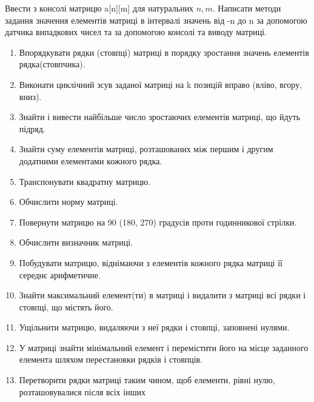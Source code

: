 \documentclass[]{article}
\begin{document}
Ввести з консолі матрицю a[n][m] для натуральних $n,m$. Написати методи задання значення елементів матриці в інтервалі значень від -n до n за допомогою датчика випадкових чисел та за допомогою консолі та виводу матриці.
\begin{enumerate}
\def\labelenumi{2.\arabic{enumi}.}

\item Впорядкувати рядки (стовпці) матриці в порядку зростання значень елементів рядка(стовпчика).
\item Виконати циклічний зсув заданої матриці на k позицій вправо (вліво, вгору, вниз).
\item Знайти і вивести найбільше число зростаючих елементів матриці, що йдуть підряд.
\item Знайти суму елементів матриці, розташованих між першим і другим додатними елементами кожного рядка.
\item Транспонувати квадратну матрицю.
\item Обчислити норму матриці.
\item Повернути матрицю на 90 (180, 270) градусів проти годинникової стрілки.
\item Обчислити визначник матриці.
\item Побудувати матрицю, віднімаючи з елементів кожного рядка матриці її середнє арифметичне.
\item Знайти максимальний елемент(ти) в матриці і видалити з матриці всі рядки і стовпці, що містять його.
\item Ущільнити матрицю, видаляючи з неї рядки і стовпці, заповнені нулями.
\item У матриці знайти мінімальний елемент і перемістити його на місце заданного елемента шляхом перестановки рядків і стовпців.
\item Перетворити рядки матриці таким чином, щоб елементи, рівні нулю, розташовувалися після всіх інших


\end{enumerate}
\end{document}

